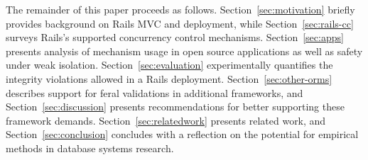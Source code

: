The remainder of this paper proceeds as
follows. Section~\ref{sec:motivation} briefly provides background on
Rails MVC and deployment, while Section~\ref{sec:rails-cc} surveys
Rails's supported concurrency control
mechanisms. Section~\ref{sec:apps} presents analysis of mechanism
usage in open source applications as well as safety under weak
isolation.  Section~\ref{sec:evaluation} experimentally quantifies the
integrity violations allowed in a Rails
deployment. Section~\ref{sec:other-orms} describes support for feral
validations in additional frameworks, and Section~\ref{sec:discussion}
presents recommendations for better supporting these framework
demands. Section~\ref{sec:relatedwork} presents related work, and
Section~\ref{sec:conclusion} concludes with a reflection on the
potential for empirical methods in database systems research.

